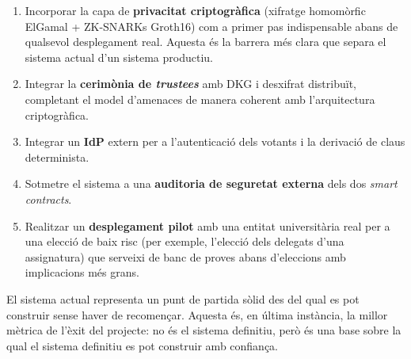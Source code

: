 \begin{enumerate}
    \item Incorporar la capa de \textbf{privacitat criptogràfica} (xifratge
    homomòrfic ElGamal + ZK-SNARKs Groth16) com a primer pas
    indispensable abans de qualsevol desplegament real. Aquesta és la
    barrera més clara que separa el sistema actual d'un sistema
    productiu.

    \item Integrar la \textbf{cerimònia de \emph{trustees}} amb DKG i
    desxifrat distribuït, completant el model d'amenaces de manera
    coherent amb l'arquitectura criptogràfica.

    \item Integrar un \textbf{\acl{IdP}} extern per a l'autenticació
    dels votants i la derivació de claus determinista.

    \item Sotmetre el sistema a una \textbf{auditoria de seguretat
    externa} dels dos \emph{smart contracts}.

    \item Realitzar un \textbf{desplegament pilot} amb una entitat
    universitària real per a una elecció de baix risc (per exemple,
    l'elecció dels delegats d'una assignatura) que serveixi de banc
    de proves abans d'eleccions amb implicacions més grans.
\end{enumerate}

El sistema actual representa un punt de partida sòlid des del qual
es pot construir sense haver de recomençar. Aquesta és, en última
instància, la millor mètrica de l'èxit del projecte: no és el
sistema definitiu, però és una base sobre la qual el sistema
definitiu es pot construir amb confiança.
